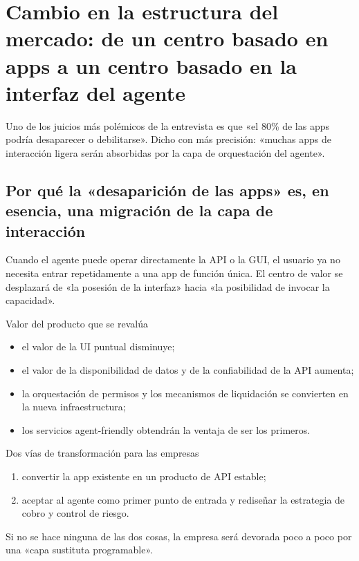 \section{Cambio en la estructura del mercado: de un centro basado en apps a un centro basado en la interfaz del agente}

Uno de los juicios más polémicos de la entrevista es que «el 80\% de las apps podría desaparecer o debilitarse». Dicho con más precisión: «muchas apps de interacción ligera serán absorbidas por la capa de orquestación del agente».

\subsection{Por qué la «desaparición de las apps» es, en esencia, una migración de la capa de interacción}

Cuando el agente puede operar directamente la API o la GUI, el usuario ya no necesita entrar repetidamente a una app de función única. El centro de valor se desplazará de «la posesión de la interfaz» hacia «la posibilidad de invocar la capacidad».

\begin{importantbox}{Valor del producto que se revalúa}
\begin{itemize}
    \item el valor de la UI puntual disminuye;
    \item el valor de la disponibilidad de datos y de la confiabilidad de la API aumenta;
    \item la orquestación de permisos y los mecanismos de liquidación se convierten en la nueva infraestructura;
    \item los servicios agent-friendly obtendrán la ventaja de ser los primeros.
\end{itemize}
\end{importantbox}

\begin{knowledgebox}{Dos vías de transformación para las empresas}
\begin{enumerate}
    \item convertir la app existente en un producto de API estable;
    \item aceptar al agente como primer punto de entrada y rediseñar la estrategia de cobro y control de riesgo.
\end{enumerate}
Si no se hace ninguna de las dos cosas, la empresa será devorada poco a poco por una «capa sustituta programable».
\end{knowledgebox}

